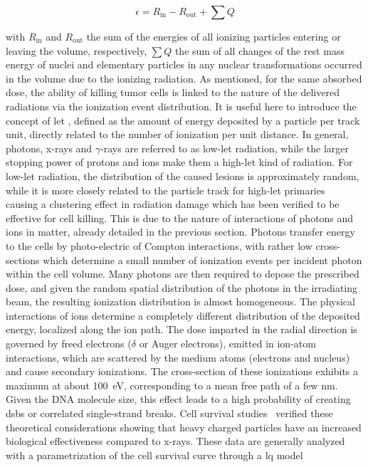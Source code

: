 \begin{equation}
\epsilon = R_{\mathrm{in}} - R_{\mathrm{out}} + \sum{Q}
\label{chap1::eq::impEnergyDef}
\end{equation}

with $R_{\mathrm{in}}$ and $R_{\mathrm{out}}$ the sum of the energies of all ionizing particles entering or leaving the volume, respectively, $ \sum{Q}$ the sum of all changes of the rest mass energy of nuclei and elementary particles in any nuclear transformations occurred in the volume due to the ionizing radiation.
As mentioned, for the same absorbed dose, the ability of killing tumor cells is linked to the nature of the delivered radiations via the ionization event distribution. It is useful here to introduce the concept of \gls{let} , defined as the amount of energy deposited by a particle per track unit, directly related to the number of ionization per unit distance. In general, photons, x-rays and $\gamma$-rays are referred to as low-\gls{let} radiation, while the larger stopping power of protons and ions make them a high-\gls{let} kind of radiation. For low-\gls{let} radiation, the distribution of the caused lesions is approximately random, while it is more closely related to the particle track for high-\gls{let} primaries~\parencite{Lobrich1996} causing a clustering effect in radiation damage which has been verified to be effective for cell killing\parencite{Holley1996, Rydberg1996}. This is due to the nature of interactions of photons and ions in matter, already detailed in the previous section. 
Photons transfer energy to the cells by photo-electric of Compton interactions, with rather low cross-sections which determine a small number of ionization events per incident photon within the cell volume. Many photons are then required to depose the prescribed dose, and given the random spatial distribution of the photons in the irradiating beam, the resulting ionization distribution is almost homogeneous. The physical interactions of ions determine a completely different distribution of the deposited energy, localized along the ion path. The dose imparted in the radial direction is governed by freed electrons ($\delta$ or Auger electrons), emitted in ion-atom interactions, which are scattered by the medium atoms (electrons and nucleus) and cause secondary ionizations. The cross-section of these ionizations exhibits a maximum at about 100~eV, corresponding to a mean free path of a few nm. Given the DNA molecule size, this effect leads to a high probability of creating \glspl{dsb} or correlated single-strand breaks. %
Cell survival studies~\parencite{Tobias1982, Blakely1984} verified these theoretical considerations showing that heavy charged particles have an increased biological effectiveness compared to x-rays. These data are generally analyzed with a parametrization of the cell survival curve through a \gls{lq} model~\parencite{Hall2012}

